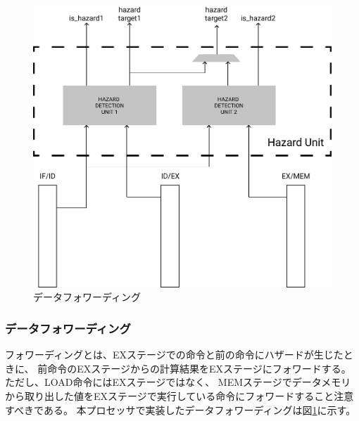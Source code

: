\documentclass[../main.tex]{subfiles}
\begin{document}
        \begin{figure}[h]
            \centering
            \includegraphics[width = 1.2\columnwidth]{../images/hazard.png}
            \caption{データフォワーディング}
            \label{fig:forwarding}
        \end{figure}
        
        \subsubsection{データフォワーディング} \label{sssec:forwarding}
        フォワーディングとは、EXステージでの命令と前の命令にハザードが生じたときに、
        前命令のEXステージからの計算結果をEXステージにフォワードする。
        ただし、LOAD命令にはEXステージではなく、
        MEMステージでデータメモリから取り出した値をEXステージで実行している命令にフォワードすること注意すべきである。
        本プロセッサで実装したデータフォワーディングは図\ref{fig:forwarding}に示す。
\end{document}
